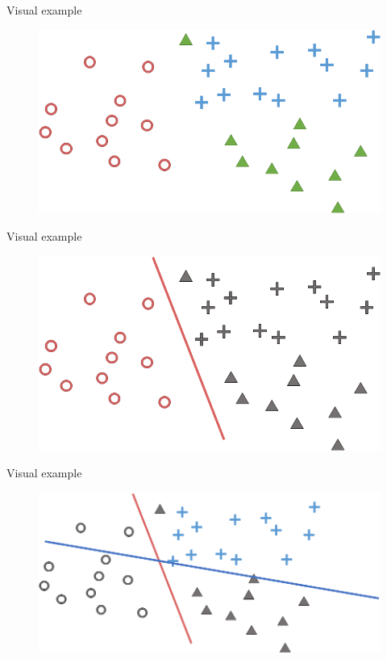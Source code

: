 \documentclass[aspectratio=169]{../latex_main/tntbeamer}  %
\begin{document}
	
	\begin{frame}{Visual example}
	    \begin{figure}
	        \centering
	        \includegraphics[scale=.5]{Bild49}
	    \end{figure}
	\end{frame}
	
	
	\begin{frame}{Visual example}
	    \begin{figure}
	        \centering
	        \includegraphics[scale=.5]{Bild50}
	    \end{figure}
	\end{frame}
	
	\begin{frame}{Visual example}
	    \begin{figure}
	        \centering
	        \includegraphics[scale=.5]{Bild51}
	    \end{figure}
	\end{frame}
	
\end{document}

